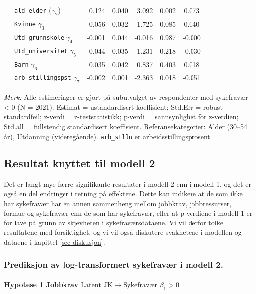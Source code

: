\documentclass[
  12pt,
  a4paper,
  DIV=11,
  numbers=noendperiod]{scrartcl}
\let\oldparagraph\paragraph
\renewcommand{\paragraph}[1]{\oldparagraph{#1}\mbox{}}
\begin{document}
\begin{table}[htbp]
\begin{tabular}{@{}llrrrrc@{}}
& \texttt{ald\_elder} ($\gamma_2$)        & 0.124 & 0.040 & 3.092  & 0.002  & 0.073 \\
& \texttt{Kvinne} $\gamma_3$            & 0.056 & 0.032 & 1.725  & 0.085  & 0.040 \\
& \texttt{Utd\_grunnskole} $\gamma_4$   & -0.001& 0.044 & -0.016 & 0.987  & -0.000 \\
& \texttt{Utd\_universitet} $\gamma_5$  & -0.044& 0.035 & -1.231 & 0.218  & -0.030 \\
& \texttt{Barn} $\gamma_6$              & 0.035 & 0.042 & 0.837  & 0.403  & 0.018 \\
& \texttt{arb\_stillingspst} $\gamma_7$ & -0.002& 0.001 & -2.363 & 0.018  & -0.051 \\
\bottomrule
\end{tabular}
\raggedright
\footnotesize{%
\textit{Merk:} Alle estimeringer er gjort på subutvalget av respondenter med sykefravær < 0 (N = 2021). Estimat = ustandardisert koeffisient; Std.Err = robust standardfeil; z-verdi = z-teststatistikk; p-verdi = sannsynlighet for z-verdien; Std.all = fullstendig standardisert koeffisient. Referansekategorier: Alder (30–54 år), Utdanning (videregående). \texttt{arb\_stlln} er arbeidsstillingsprosent}
\end{table}

\subsection{Resultat knyttet til modell
2}\label{resultat-knyttet-til-modell-2-1}

Det er langt mye færre signifikante resultater i modell 2 enn i modell
1, og det er også en del endringer i retning på effektene. Dette kan
indikere at de som ikke har sykefravær har en annen sammenheng mellom
jobbkrav, jobbressurser, formue og sykefravær enn de som har sykefravær,
eller at p-verdiene i modell 1 er for lave på grunn av skjevheten i
sykefraværsdataene. Vi vil derfor tolke resultatene med forsiktighet, og
vi vil også diskutere svakhetene i modellen og dataene i kapittel
\ref{sec-diskusjon}.

\subsubsection{Prediksjon av log-transformert sykefravær i modell
2.}\label{prediksjon-av-log-transformert-sykefravuxe6r-i-modell-2.}

\paragraph{\texorpdfstring{Hypotese 1 Jobbkrav
\(\text{Latent JK} \rightarrow \text{Sykefravær } \beta_1 > 0\)}{Hypotese 1 Jobbkrav \textbackslash text\{Latent JK\} \textbackslash rightarrow \textbackslash text\{Sykefravær \} \textbackslash beta\_1 \textgreater{} 0}}\label{hypotese-1-jobbkrav-textlatent-jk-rightarrow-textsykefravuxe6r-beta_1-0-1}
\end{document}
